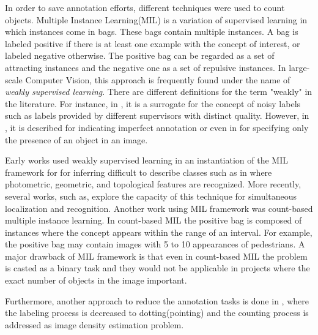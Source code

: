 
In order to save annotation efforts, different techniques were used to count objects. Multiple Instance Learning(MIL)\cite{foulds2010review} is a variation of supervised learning in which instances come in bags. These bags contain multiple instances. A bag is labeled positive if there is at least one example with the concept of interest, or labeled negative otherwise. The positive bag can be regarded as a set of attracting instances and the negative one as a set of repulsive instances. In large-scale Computer Vision, this approach is frequently found under the name of \textit{weakly supervised learning}\cite{weber2000unsupervised, fergus2003object}. There are different definitions for the term "weakly" in the literature. For instance, in \cite{dekel2009good}, it is a surrogate for the concept of noisy labels such as labels provided by different supervisors with distinct quality. However, in \cite{raykar2009supervised}, it is described for indicating imperfect annotation or even in \cite{wang2013weakly} for specifying only the presence of an object in an image. 

\indent Early works used weakly supervised learning in an instantiation of the MIL framework for for inferring difficult to describe classes such as in\cite{todorovic2006extracting} where photometric, geometric, and topological features are recognized. More recently, several works, such as\cite{nguyen2009weakly}, explore the capacity of this technique for simultaneous localization and recognition. Another work using MIL framework was count-based multiple instance learning\cite{foulds2010review}. In count-based MIL the positive bag is composed of instances where the concept appears within the range of an interval. For example, the positive bag may contain images with 5 to 10 appearances of pedestrians. A major drawback of MIL framework is that even in count-based MIL the problem is casted as a binary task and they would not be applicable in projects where the exact number of objects in the image important. 

Furthermore, another approach to reduce the annotation tasks is done in \cite{flaccavento2011learning}, where the labeling process is decreased to dotting(pointing) and the counting process is addressed as image density estimation problem.  

